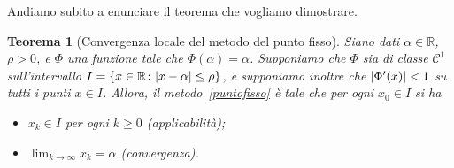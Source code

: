 \documentclass[a4paper]{report}
\DeclarePairedDelimiter{\abs}{\lvert}{\rvert}
\newtheorem{theorem}{Teorema}[chapter]
\theoremstyle{definition}
\theoremstyle{remark}
\begin{document}
Andiamo subito a enunciare il teorema che vogliamo dimostrare.

\begin{theorem}[Convergenza locale del metodo del punto fisso]\label{thm:puntofisso}
Siano dati $\alpha\in\mathbb{R}$, $\rho>0$, e $\Phi$ una funzione tale che $\Phi(\alpha)=\alpha$. Supponiamo che $\Phi$ sia di classe $\mathcal{C}^1$ sull'intervallo $I = \{x\in\mathbb{R} \colon \abs{x-\alpha} \leq \rho\}$, e supponiamo inoltre che $\abs{\Phi'(x)} < 1$ su tutti i punti $x\in I$. Allora, il metodo~\eqref{puntofisso} è tale che per ogni $x_0 \in I$ si ha
\begin{itemize}
    \item $x_k \in I$ per ogni $k \geq 0$ (applicabilità);
    \item $\lim_{k\to\infty} x_k = \alpha$ (convergenza).
\end{itemize}
\end{theorem}
\end{document}
